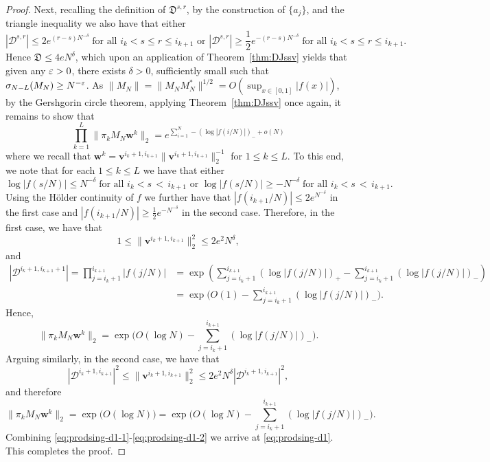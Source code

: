 \documentclass{amsart}
\numberwithin{equation}{section}
\def\corAB{}
\def\corABa{}
\def\corOZ{}
\begin{document}
\begin{proof}
 Next, recalling the definition of $\mathfrak{D}^{s,r}$, by the construction of $\{a_j\}$, \corAB{and the triangle inequality} we also have that either
 \[
   |\mathcal{D}^{s,r}| \leq \corAB{2} e^{(r-s)N^{-\delta}}
   \;\text{for all $i_k < s \leq r \leq i_{k+1}$  or }
   |\mathcal{D}^{s,r}| \geq \corAB{\frac12} e^{-(r-s)N^{-\delta}}
   \;\text{for all $i_k < s \leq r \leq i_{k+1}$.}
 \]
 Hence $\mathfrak{D} \leq \corAB{4}eN^{\delta}$, \corAB{which upon an application of  Theorem~\ref{thm:DJssv} yields that given any $\varepsilon >0$, there exists $\delta>0$, sufficiently small such that $\sigma_{N-L}(M_N) \ge N^{-\varepsilon}$.} \corABa{As $\|M_N\| =\|M_N M_N^*\|^{1/2} = O(\sup_{x \in[0,1]} |f(x)|)$, by the Gershgorin circle theorem}, applying Theorem~\ref{thm:DJssv} \corOZ{once again, it} remains to show that
 \begin{equation}\label{eq:prodsing-d1}
    \prod_{k=1}^{\corAB{L}}\|\pi_k M_N {\bm w}^k\|_2
    =
    e^{\sum_{i=1}^N -(\log |f(i/N)|)_{-} + o(N)}
 \end{equation}
 where we recall that
 ${\bm w}^k ={\bm v}^{i_k+1, i_{k+1}}\|{\bm v}^{i_k+1, i_{k+1}}\|_2^{-1}$ for $1 \leq k \leq \corAB{L}.$ \corAB{To this end, we note that} for each
 $1 \leq k\leq \corOZ{L}$ we have that either
 \[
   \log |f(s/N)| \leq N^{-\delta}
  \; \text{for all $i_k < s \, \corAB{<} \, i_{k+1}$ or }
   \log |f(s/N)| \geq -N^{-\delta}
  \; \text{for all $i_k < s \, \corAB{<}\,  i_{k+1}$.}
 \]
 \corAB{Using the H\"older continuity of $f$ we further have that $|f(i_{k+1}/N)| \le 2 e^{N^{-\delta}}$ in the first case and $|f(i_{k+1}/N)| \ge \frac12 e^{-N^{-\delta}}$ in the second case.} Therefore, in the first case, we have that
 \[
   1
   \leq \|{\bm v}^{i_k+1, i_{k+1}}\|^2_2
   \leq 2 e^2 N^{\delta},
 \]
 and
 \begin{align*}
   |\mathcal{D}^{i_k+1,i_{k+1}+1}| \corAB{= \prod_{j=i_k+1}^{i_{k+1}} |f(j/N)|} & = \corAB{ \exp\left( \sum_{j=i_k+1}^{i_{k+1}} (\log |f(j/N)|)_{+}- \sum_{j=i_k+1}^{i_{k+1}} (\log |f(j/N)|)_{-}\right)}\\
      & =\exp\biggl(O(1)-\sum_{j=i_k+1}^{i_{k+1}} (\log |f(j/N)|)_{-}\biggr).
 \end{align*}
 Hence,
  \begin{equation}\label{eq:prodsing-d1-1}
   \|\pi_k \corAB{M_N}{\bm w}^k\|_2
   =\exp\biggl(O(\log N)-\sum_{j=i_k+1}^{i_{k+1}} (\log |f(j/N)|)_{-}\biggr).
 \end{equation}
Arguing similarly, in the second case, we have that
 \[
   |\mathcal{D}^{i_k+1,i_{k+1}}|^2
   \leq \|{\bm v}^{i_k+1, i_{k+1}}\|^2_2
   \leq 2e^2 N^{\delta} |\mathcal{D}^{i_k+1,i_{k+1}}|^2,
 \]
 and therefore
 \begin{equation}\label{eq:prodsing-d1-2}
   \|\pi_k \corAB{M_N} {\bm w}^k\|_2
   =\exp\biggl(O(\log N)\biggr) =\exp\biggl(O(\log N)-\sum_{j=i_k+1}^{i_{k+1}} (\log |f(j/N)|)_{-}\biggr).
 \end{equation}
  \corAB{Combining \eqref{eq:prodsing-d1-1}-\eqref{eq:prodsing-d1-2} we arrive at \eqref{eq:prodsing-d1}. This completes the proof.}
 \end{proof}
\end{document}
